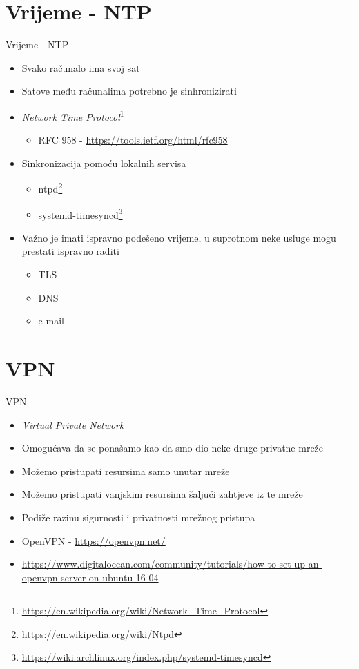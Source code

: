 \documentclass[t]{beamer}
\begin{document}
\section{Vrijeme - NTP}

\begin{frame}{Vrijeme - NTP}
    \begin{itemize}
        \item Svako računalo ima svoj sat
        \item Satove među računalima potrebno je sinhronizirati
        \item \textit{Network Time Protocol}\footnote{\url{https://en.wikipedia.org/wiki/Network_Time_Protocol}}
        \begin{itemize}
            \item RFC 958 - \url{https://tools.ietf.org/html/rfc958}
        \end{itemize}
        \item Sinkronizacija pomoću lokalnih servisa
        \begin{itemize}
            \item ntpd\footnote{\url{https://en.wikipedia.org/wiki/Ntpd}}
            \item systemd-timesyncd\footnote{\url{https://wiki.archlinux.org/index.php/systemd-timesyncd}}
        \end{itemize}
        \item Važno je imati ispravno podešeno vrijeme, u suprotnom neke usluge mogu prestati ispravno raditi
        \begin{itemize}
            \item TLS
            \item DNS
            \item e-mail
        \end{itemize}
    \end{itemize}
\end{frame}

\section{VPN}

\begin{frame}{VPN}
    \begin{itemize}
        \item \textit{Virtual Private Network}
        \item Omogućava da se ponašamo kao da smo dio neke druge privatne mreže
        \item Možemo pristupati resursima samo unutar mreže
        \item Možemo pristupati vanjskim resursima šaljući zahtjeve iz te mreže
        \item Podiže razinu sigurnosti i privatnosti mrežnog pristupa
        \item OpenVPN - \url{https://openvpn.net/}
        \item \url{https://www.digitalocean.com/community/tutorials/how-to-set-up-an-openvpn-server-on-ubuntu-16-04}
    \end{itemize}
\end{frame}
\end{document}
